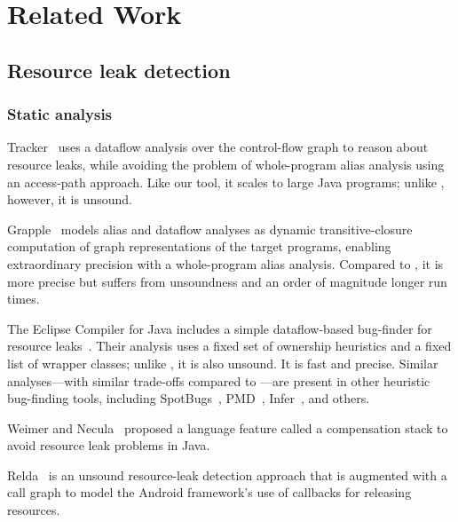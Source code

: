 \section{Related Work}
\label{sec:relatedwork}

\subsection{Resource leak detection}
\label{sec:rw-resource-leaks}



\subsubsection{Static analysis}

Tracker~\cite{TorlakC10} uses a dataflow analysis over the control-flow
graph to reason about resource leaks, while avoiding the problem of
whole-program alias analysis using an access-path approach. Like our tool,
it scales to large Java programs; unlike \tool, however, it is unsound.

Grapple~\cite{zuo2019grapple} models alias and dataflow analyses as
dynamic transitive-closure computation of graph representations of
the target programs, enabling extraordinary precision with a whole-program
alias analysis. Compared to \tool, it is more precise but suffers
from unsoundness and an order of magnitude longer run times.

The Eclipse Compiler for Java includes a simple dataflow-based
bug-finder for resource leaks~\cite{ecj-resource-leak}. Their analysis
uses a fixed set of ownership heuristics and a fixed list of wrapper
classes; unlike \tool, it is also unsound. It is fast and
 precise.  Similar analyses---with similar trade-offs
compared to \tool---are present in other heuristic bug-finding tools,
including SpotBugs~\cite{spotbugs-resource-leak},
PMD~\cite{pmd-resource-leak}, Infer~\cite{infer-resource-leak}, and others.

Weimer and Necula~\cite{WeimerN04} proposed a language feature called
a compensation stack to avoid resource leak problems in Java.

Relda~\cite{guo2013characterizing} is an unsound resource-leak
detection approach that is augmented with a call graph to model the
Android framework's use of callbacks for releasing resources.

